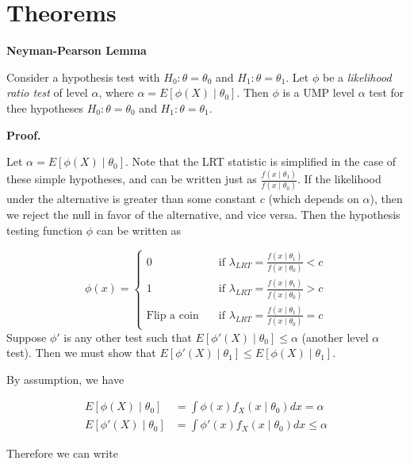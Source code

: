 \documentclass[
  letterpaper,
  DIV=11,
  numbers=noendperiod]{scrreprt}
\begin{document}
\hypertarget{theorems-6}{%
\section{Theorems}\label{theorems-6}}

\textbf{Neyman-Pearson Lemma}

Consider a hypothesis test with \(H_0: \theta = \theta_0\) and
\(H_1: \theta = \theta_1\). Let \(\phi\) be a \emph{likelihood ratio
test} of level \(\alpha\), where \(\alpha = E[\phi(X) \mid \theta_0]\).
Then \(\phi\) is a UMP level \(\alpha\) test for thee hypotheses
\(H_0: \theta = \theta_0\) and \(H_1: \theta = \theta_1\).

\textbf{Proof.}

Let \(\alpha = E[\phi(X) \mid \theta_0]\). Note that the LRT statistic
is simplified in the case of these simple hypotheses, and can be written
just as \(\frac{f(x \mid \theta_1)}{f(x \mid \theta_0)}\). If the
likelihood under the alternative is greater than some constant \(c\)
(which depends on \(\alpha\)), then we reject the null in favor of the
alternative, and vice versa. Then the hypothesis testing function
\(\phi\) can be written as

\[
\phi(x) = \begin{cases} 0 & \quad \text{if } \lambda_{LRT} = \frac{f(x \mid \theta_1)}{f(x \mid \theta_0)} < c\\
1 & \quad \text{if } \lambda_{LRT} = \frac{f(x \mid \theta_1)}{f(x \mid \theta_0)} > c\\
\text{Flip a coin} & \quad \text{if } \lambda_{LRT} = \frac{f(x \mid \theta_1)}{f(x \mid \theta_0)} = c
\end{cases}
\]Suppose \(\phi'\) is any other test such that
\(E[\phi'(X) \mid \theta_0] \leq \alpha\) (another level \(\alpha\)
test). Then we must show that
\(E[\phi'(X) \mid \theta_1] \leq E[\phi(X) \mid \theta_1]\).

By assumption, we have

\begin{align*}
    E[\phi(X) \mid \theta_0] &= \int \phi(x) f_X(x \mid \theta_0) dx = \alpha \\
    E[\phi'(X) \mid \theta_0] &= \int \phi'(x) f_X(x \mid \theta_0) dx \leq \alpha
\end{align*}

Therefore we can write
\end{document}
